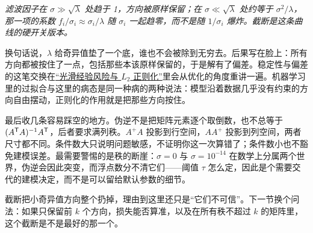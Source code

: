 \begin{center}

\emph{滤波因子在 \(\sigma\gg\sqrt\lambda\) 处趋于 1，方向被原样保留；在 \(\sigma\ll\sqrt\lambda\) 处约等于 \(\sigma^2/\lambda\)，那一项的系数 \(f_i/\sigma_i\approx\sigma_i/\lambda\) 随 \(\sigma_i\) 一起趋零，而不是随 \(1/\sigma_i\) 爆炸。截断是这条曲线的硬开关版本。}
\end{center}

换句话说，\(\lambda\) 给奇异值垫了一个底，谁也不会被除到无穷去。后果写在脸上：所有方向都被按住了一点，包括那些本该原样保留的，于是解有了偏差。稳定性与偏差的这笔交换在\hyperref[sec:09-Convex-Optimization/07-Applications/01]{``光滑经验风险与 \(L_2\) 正则化''}里会从优化的角度重讲一遍。机器学习里的过拟合与这里的病态是同一种病的两种说法：模型沿着数据几乎没有约束的方向自由摆动，正则化的作用就是把那些方向按住。

最后收几条容易踩空的地方。伪逆不是把矩阵元素逐个取倒数，也不总等于 \((A^{\mathsf{T}}A)^{-1}A^{\mathsf{T}}\)，后者要求满列秩。\(A^{+}A\) 投影到行空间，\(AA^{+}\) 投影到列空间，两者尺寸都不同。条件数大只说明问题敏感，不证明你这一次算错了；条件数小也不豁免建模误差。最需要警惕的是秩的断崖：\(\sigma=0\) 与 \(\sigma=10^{-14}\) 在数学上分属两个世界，伪逆会因此突变，而浮点数分不清它们——阈值 \(\tau\) 怎么定，因此是个需要交代的建模决定，而不是可以留给默认参数的细节。

截断把小奇异值方向整个扔掉，理由到这里还只是``它们不可信''。下一节换个问法：如果只保留前 \(k\) 个方向，损失能否算准，以及在所有秩不超过 \(k\) 的矩阵里，这个截断是不是最好的那一个。
